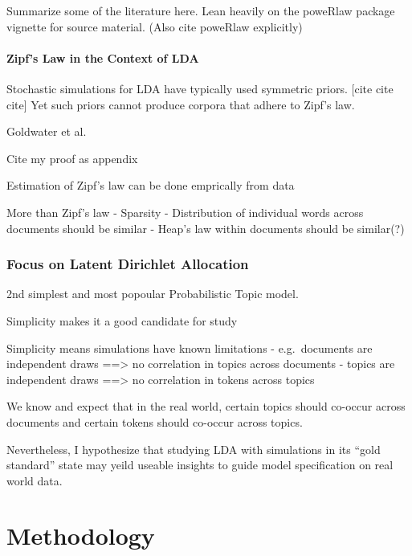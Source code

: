 \documentclass[conference,final,]{IEEEtran}
\begin{document}
Summarize some of the literature here. Lean heavily on the poweRlaw
package vignette for source material. (Also cite poweRlaw explicitly)

\hypertarget{zipfs-law-in-the-context-of-lda}{%
\paragraph{Zipf's Law in the Context of
LDA}\label{zipfs-law-in-the-context-of-lda}}

Stochastic simulations for LDA have typically used symmetric priors.
{[}cite cite cite{]} Yet such priors cannot produce corpora that adhere
to Zipf's law.

Goldwater et al.

Cite my proof as appendix

Estimation of Zipf's law can be done emprically from data

More than Zipf's law - Sparsity - Distribution of individual words
across documents should be similar - Heap's law within documents should
be similar(?)

\hypertarget{focus-on-latent-dirichlet-allocation}{%
\subsubsection{Focus on Latent Dirichlet
Allocation}\label{focus-on-latent-dirichlet-allocation}}

2nd simplest and most popoular Probabilistic Topic model.

Simplicity makes it a good candidate for study

Simplicity means simulations have known limitations - e.g.~documents are
independent draws ==\textgreater{} no correlation in topics across
documents - topics are independent draws ==\textgreater{} no correlation
in tokens across topics

We know and expect that in the real world, certain topics should
co-occur across documents and certain tokens should co-occur across
topics.

Nevertheless, I hypothesize that studying LDA with simulations in its
``gold standard'' state may yeild useable insights to guide model
specification on real world data.

\hypertarget{methodology}{%
\section{Methodology}\label{methodology}}
\end{document}
